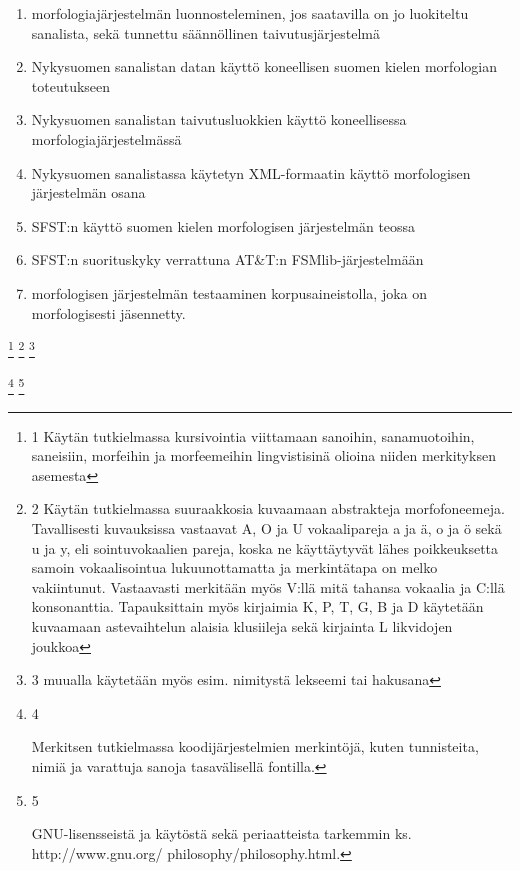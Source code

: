 \documentclass[free]{flammie}
\begin{document}
\begin{enumerate}
    \item  morfologiajärjestelmän luonnosteleminen, jos saatavilla on jo luokiteltu sanalista, sekä tunnettu säännöllinen taivutusjärjestelmä
    \item Nykysuomen sanalistan datan käyttö koneellisen suomen kielen morfologian toteutukseen
    \item Nykysuomen sanalistan taivutusluokkien käyttö koneellisessa morfologiajärjestelmässä
    \item Nykysuomen sanalistassa käytetyn XML-formaatin käyttö morfologisen järjestelmän osana
    \item SFST:n käyttö suomen kielen morfologisen järjestelmän teossa
    \item SFST:n suorituskyky verrattuna AT\&T:n FSMlib-järjestelmään
    \item morfologisen järjestelmän testaaminen korpusaineistolla, joka on morfologisesti jäsennetty.
\end{enumerate}

\footnote{1
    Käytän tutkielmassa kursivointia viittamaan sanoihin, sanamuotoihin, saneisiin,
morfeihin ja morfeemeihin lingvistisinä olioina niiden merkityksen asemesta}
\footnote{
    2
Käytän tutkielmassa suuraakkosia kuvaamaan abstrakteja morfofoneemeja.
Tavallisesti kuvauksissa vastaavat A, O ja U vokaalipareja a ja ä, o ja ö sekä u
ja y, eli sointuvokaalien pareja, koska ne käyttäytyvät lähes poikkeuksetta
samoin vokaalisointua lukuunottamatta ja merkintätapa on melko vakiintunut.
Vastaavasti merkitään myös V:llä mitä tahansa vokaalia ja C:llä konsonanttia.
Tapauksittain myös kirjaimia K, P, T, G, B ja D käytetään kuvaamaan
astevaihtelun alaisia klusiileja sekä kirjainta L likvidojen joukkoa}
\footnote{3
muualla
käytetään myös esim. nimitystä lekseemi tai hakusana
}

\footnote{
4

Merkitsen tutkielmassa koodijärjestelmien merkintöjä, kuten tunnisteita, nimiä ja varattuja
sanoja tasavälisellä fontilla.
}
\footnote{
5

GNU-lisensseistä ja käytöstä sekä periaatteista tarkemmin ks. http://www.gnu.org/
philosophy/philosophy.html.
}
\end{document}

